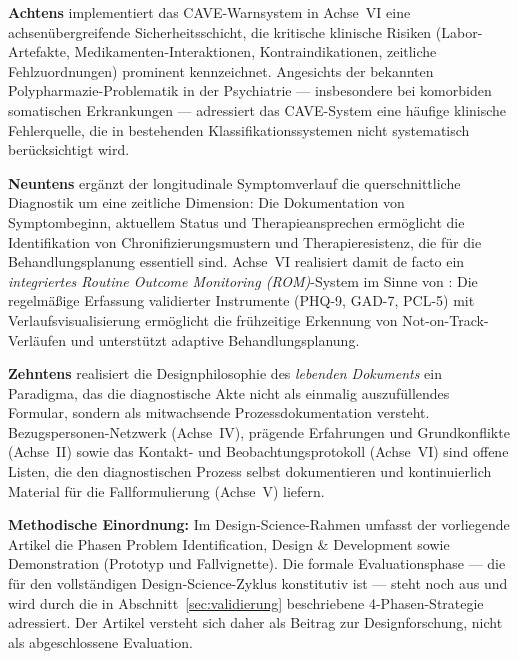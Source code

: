 \documentclass[11pt,a4paper]{article}
\begin{document}
\textbf{Achtens} implementiert das CAVE-Warnsystem in Achse~VI eine achsen\"ubergreifende Sicherheitsschicht, die kritische klinische Risiken (Labor-Artefakte, Medikamenten-Interaktionen, Kontraindikationen, zeitliche Fehlzuordnungen) prominent kennzeichnet. Angesichts der bekannten Polypharmazie-Problematik in der Psychiatrie --- insbesondere bei komorbiden somatischen Erkrankungen --- adressiert das CAVE-System eine h\"aufige klinische Fehlerquelle, die in bestehenden Klassifikationssystemen nicht systematisch ber\"ucksichtigt wird.

\textbf{Neuntens} erg\"anzt der longitudinale Symptomverlauf die querschnittliche Diagnostik um eine zeitliche Dimension: Die Dokumentation von Symptombeginn, aktuellem Status und Therapieansprechen erm\"oglicht die Identifikation von Chronifizierungsmustern und Therapieresistenz, die f\"ur die Behandlungsplanung essentiell sind. Achse~VI realisiert damit de facto ein \textit{integriertes Routine Outcome Monitoring (ROM)}-System im Sinne von \citet{Barkham2023}: Die regelm\"a\ss{}ige Erfassung validierter Instrumente (PHQ-9, GAD-7, PCL-5) mit Verlaufsvisualisierung erm\"oglicht die fr\"uhzeitige Erkennung von Not-on-Track-Verl\"aufen und unterst\"utzt adaptive Behandlungsplanung.

\textbf{Zehntens} realisiert die Designphilosophie des \textit{lebenden Dokuments} ein Paradigma, das die diagnostische Akte nicht als einmalig auszuf\"ullendes Formular, sondern als mitwachsende Prozessdokumentation versteht. Bezugspersonen-Netzwerk (Achse~IV), pr\"agende Erfahrungen und Grundkonflikte (Achse~II) sowie das Kontakt- und Beobachtungsprotokoll (Achse~VI) sind offene Listen, die den diagnostischen Prozess selbst dokumentieren und kontinuierlich Material f\"ur die Fallformulierung (Achse~V) liefern.

\vspace{0.5em}
\textbf{Methodische Einordnung:} Im Design-Science-Rahmen \citep{Hevner2004, Peffers2007} umfasst der vorliegende Artikel die Phasen Problem Identification, Design \& Development sowie Demonstration (Prototyp und Fallvignette). Die formale Evaluationsphase --- die f\"ur den vollst\"andigen Design-Science-Zyklus konstitutiv ist --- steht noch aus und wird durch die in Abschnitt~\ref{sec:validierung} beschriebene 4-Phasen-Strategie adressiert. Der Artikel versteht sich daher als Beitrag zur Designforschung, nicht als abgeschlossene Evaluation.
\end{document}
